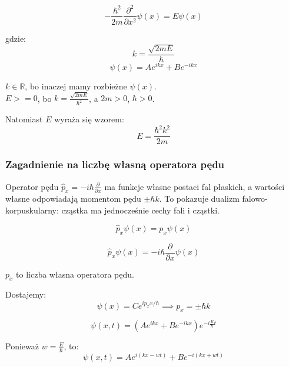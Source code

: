 \begin{equation*}
    - \frac{\hbar^2}{2m} \frac{\partial^2}{\partial x^2} \psi(x) = E \psi(x)
\end{equation*}

gdzie:
\begin{equation*}
    k = \frac{\sqrt{2mE}}{\hbar}
\end{equation*}
%
\begin{equation*}
    \psi(x) = A e^{ikx} + B e^{-ikx}
\end{equation*}

$ k \in \mathbb{R} $, bo inaczej mamy rozbieżne $\psi(x)$. \\
$ E >= 0 $, bo $ k = \frac{\sqrt{2mE}}{\hbar^2} $, a $ 2m > 0 $, $ \hbar > 0 $.

Natomiast $E$ wyraża się wzorem:
\begin{equation*}
    E = \frac{\hbar^2 k^2}{2m}
\end{equation*}

\subsubsection{Zagadnienie na liczbę własną operatora pędu}
Operator pędu $\hat{p}_x = - i \hbar \frac{\partial}{\partial x}$ ma funkcje własne postaci fal płaskich, a wartości własne
odpowiadają momentom pędu $\pm \hbar k$. To pokazuje dualizm falowo-korpuskularny: cząstka ma jednocześnie cechy fali i cząstki.

\begin{equation*}
    \hat{p}_x \psi(x) = p_x \psi(x)
\end{equation*}

\begin{equation*}
    \hat{p}_x \psi(x) = -i\hbar \frac{\partial}{\partial x} \psi(x)
\end{equation*}

$p_x$ to liczba własna operatora pędu.

Dostajemy:
\begin{equation*}
    \psi(x) = C e^{i p_x x / \hbar} \implies p_x = \pm \hbar k
\end{equation*}

\begin{equation*}
    \psi(x, t) = \left( A e^{ikx} + B e^{-ikx} \right) e^{-i \frac{E}{\hbar} t}
\end{equation*}

Ponieważ $w = \frac{E}{\hbar}$, to:
\begin{equation*}
    \psi(x, t) = A e^{i(kx - wt)} + B e^{-i(kx + wt)}
\end{equation*}

